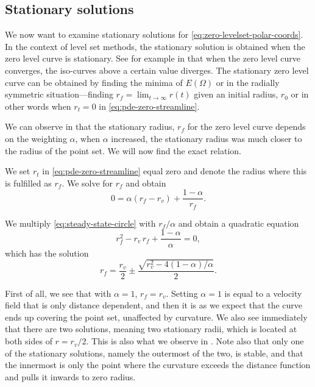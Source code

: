 \subsection*{Stationary solutions}
We now want to examine stationary solutions for \eqref{eq:zero-levelset-polar-coords}. In the context of level set methods, the stationary solution is obtained when the zero level curve is stationary. See for example in  that when the zero level curve converges, the iso-curves above a certain value diverges. The stationary zero level curve can be obtained by finding the minima of $E(\Omega)$ or in the radially symmetric situation---finding $r_f = \lim_{t\to\infty} r(t)$ given an initial radius, $r_0$ or in other words when $r_t=0$ in \eqref{eq:pde-zero-streamline}.

We can observe in  that the stationary radius, $r_f$ for the zero level curve depends on the weighting $\alpha$, when $\alpha$ increased, the stationary radius was much closer to the radius of the point set. We will now find the exact relation.

We set $r_t$ in \eqref{eq:pde-zero-streamline} equal zero and denote the radius where this is fulfilled as $r_f$. We solve for $r_f$ and obtain  
\begin{equation}
    0 = \alpha (r_f-r_v) + \frac{1-\alpha}{r_f}.
    \label{eq:steady-state-circle}
\end{equation}

We multiply \eqref{eq:steady-state-circle} with $r_f/\alpha$ and obtain a quadratic equation
\begin{equation*}
    r_f^2-r_v\, r_f+ \frac{1-\alpha}{\alpha} = 0,
\end{equation*}
which has the solution
\begin{equation}
    r_f = \frac{r_v}{2} \pm \frac{\sqrt{r_v^2-4 (1-\alpha)/\alpha}}{2}.
    \label{eq:stationary-radius}
\end{equation}

First of all, we see that with $\alpha=1$, $r_f=r_v$. Setting $\alpha=1$ is equal to a velocity field that is only distance dependent, and then it is as we expect that the curve ends up covering the point set, unaffected by curvature. We also see immediately that there are two solutions, meaning two stationary radii, which is located at both sides of $r=r_v/2$. This is also what we observe in . Note also that only one of the stationary solutions, namely the outermost of the two, is stable, and that the innermost is only the point where the curvature exceeds the distance function and pulls it inwards to zero radius. 

